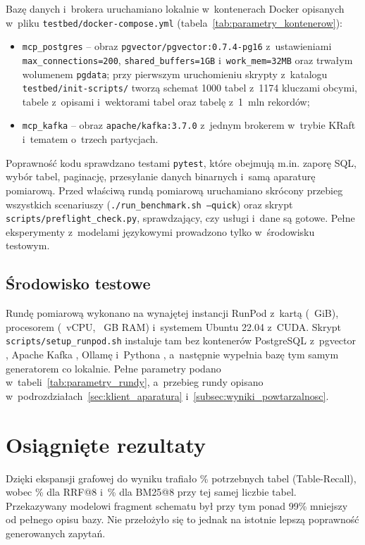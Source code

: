 Bazę danych i~brokera uruchamiano lokalnie w~kontenerach Docker opisanych w~pliku \texttt{testbed/docker-compose.yml} (tabela~\ref{tab:parametry_kontenerow}):
\begin{itemize}
    \item \texttt{mcp\_postgres} -- obraz \texttt{pgvector/pgvector:0.7.4-pg16} z~ustawieniami \texttt{max\_connections=200}, \texttt{shared\_buffers=1GB} i~\texttt{work\_mem=32MB} oraz trwałym wolumenem \texttt{pgdata}; przy pierwszym uruchomieniu skrypty z~katalogu \texttt{testbed/init-scripts/} tworzą schemat 1000 tabel z~1174 kluczami obcymi, tabele z~opisami i~wektorami tabel oraz tabelę z~1~mln rekordów;
    \item \texttt{mcp\_kafka} -- obraz \texttt{apache/kafka:3.7.0} z~jednym brokerem w~trybie KRaft i~tematem o~trzech partycjach.
\end{itemize}

Poprawność kodu sprawdzano testami \texttt{pytest}, które obejmują m.in. zaporę SQL, wybór tabel, paginację, przesyłanie danych binarnych i~samą aparaturę pomiarową. Przed właściwą rundą pomiarową uruchamiano skrócony przebieg wszystkich scenariuszy (\texttt{./run\_benchmark.sh --quick}) oraz skrypt \texttt{scripts/preflight\_check.py}, sprawdzający, czy usługi i~dane są gotowe. Pełne eksperymenty z~modelami językowymi prowadzono tylko w~środowisku testowym.

\subsection*{Środowisko testowe}

Rundę pomiarową wykonano na wynajętej instancji RunPod z~kartą \wynGpu{} (\wynGpuMem~GiB), procesorem \wynCpu{} (\wynVcpu~vCPU, \wynRam~GB RAM) i~systemem Ubuntu 22.04 z~CUDA. Skrypt \texttt{scripts/setup\_runpod.sh} instaluje tam bez kontenerów PostgreSQL \wynPg{} z~pgvector \wynPgvector, Apache Kafka \wynKafka, Ollamę \wynOllama{} i~Pythona \wynPython{}, a~następnie wypełnia bazę tym samym generatorem co lokalnie. Pełne parametry podano w~tabeli~\ref{tab:parametry_rundy}, a~przebieg rundy opisano w~podrozdziałach~\ref{sec:klient_aparatura} i~\ref{subsec:wyniki_powtarzalnosc}.


\section{Osiągnięte rezultaty}
\label{sec:wstep_rezultaty}

Dzięki ekspansji grafowej do wyniku trafiało \wynRecallGraphFive\% potrzebnych tabel (Table-Recall), wobec \wynRecallRrfEight\% dla RRF@8 i~\wynRecallBmEight\% dla BM25@8 przy tej samej liczbie tabel. Przekazywany modelowi fragment schematu był przy tym ponad 99\% mniejszy od pełnego opisu bazy. Nie przełożyło się to jednak na istotnie lepszą poprawność generowanych zapytań.

